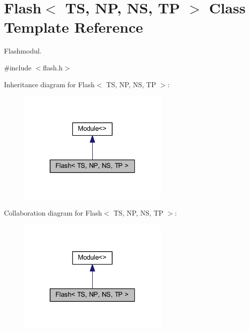 \hypertarget{class_flash}{}\section{Flash$<$ TS, NP, NS, TP $>$ Class Template Reference}
\label{class_flash}


Flashmodul.  




{\ttfamily \#include $<$flash.\+h$>$}



Inheritance diagram for Flash$<$ TS, NP, NS, TP $>$\+:
\nopagebreak
\begin{figure}[H]
\begin{center}
\leavevmode
\includegraphics[width=208pt]{class_flash__inherit__graph}
\end{center}
\end{figure}


Collaboration diagram for Flash$<$ TS, NP, NS, TP $>$\+:
\nopagebreak
\begin{figure}[H]
\begin{center}
\leavevmode
\includegraphics[width=208pt]{class_flash__coll__graph}
\end{center}
\end{figure}
